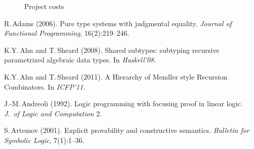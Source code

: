 \documentclass[11pt,twocolumn]{article}
\begin{document}
\begin{figure*}[t]
\caption{Project costs}
\hspace*{30mm}
\vspace*{15cm}
\end{figure*}

{\footnotesize
\begin{thebibliography}{000}


R.\,Adams (2006).
\newblock Pure type systems with judgmental equality.
\newblock \emph{Journal of Functional Programming}, 16(2):219--246.

K.Y.\,Ahn and T.\,Sheard (2008).
\newblock Shared subtypes: subtyping recursive parametrized algebraic data
types.  
\newblock In \emph{Haskell'08}.  

K.Y.\,Ahn and T.\,Sheard (2011).
\newblock A Hierarchy of Mendler style Recursion Combinators. 
\newblock In \emph{ICFP'11}.  




J.-M.\,Andreoli (1992).
\newblock Logic programming with focusing proof in linear logic.
\newblock \emph{J.\ of Logic and Computation} 2.

S.\,Artemov (2001).
\newblock Explicit provability and constructive semantics.
\newblock \emph{Bulletin for Symbolic Logic}, 7(1):1--36.



\end{thebibliography}}
\end{document}
